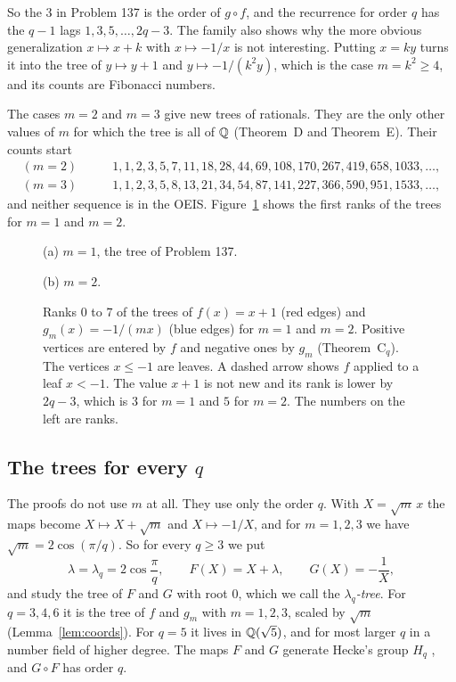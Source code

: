 So the $3$ in Problem 137 is the order of $g\circ f$, and the recurrence for order $q$ has the
$q-1$ lags $1,3,5,\dots,2q-3$. The family also shows why the more obvious generalization
$x\mapsto x+k$ with $x\mapsto-1/x$ is not interesting. Putting $x=ky$ turns it into the tree of
$y\mapsto y+1$ and $y\mapsto-1/(k^2y)$, which is the case $m=k^2\ge4$, and its counts are
Fibonacci numbers.

The cases $m=2$ and $m=3$ give new trees of rationals. They are the only other values of $m$ for
which the tree is all of $\mathbb{Q}$ (Theorem~D and Theorem~E). Their counts start
\begin{align*}
(m=2)&\qquad 1, 1, 2, 3, 5, 7, 11, 18, 28, 44, 69, 108, 170, 267, 419, 658, 1033, \dots,\\
(m=3)&\qquad 1, 1, 2, 3, 5, 8, 13, 21, 34, 54, 87, 141, 227, 366, 590, 951, 1533, \dots,
\end{align*}
and neither sequence is in the OEIS. Figure~\ref{fig:trees} shows the first ranks of the trees for
$m=1$ and $m=2$.

\begin{figure}[p]
\centering
\resizebox{0.86\textwidth}{!}{}

\medskip
{\small (a) $m=1$, the tree of Problem 137.}

\bigskip
\resizebox{\textwidth}{!}{}

\medskip
{\small (b) $m=2$.}
\caption{Ranks $0$ to $7$ of the trees of $f(x)=x+1$ (\textcolor{fred}{red} edges) and
$g_m(x)=-1/(mx)$ (\textcolor{gblue}{blue} edges) for $m=1$ and $m=2$. Positive vertices are entered
by $f$ and negative ones by $g_m$ (Theorem~C$_q$). The vertices $x\le-1$ are leaves. A dashed arrow
shows $f$ applied to a leaf $x<-1$. The value $x+1$ is not new and its rank is lower by $2q-3$, which
is $3$ for $m=1$ and $5$ for $m=2$. The numbers on the left are ranks.}
\label{fig:trees}
\end{figure}

\subsection{The trees for every \texorpdfstring{$q$}{q}}

The proofs do not use $m$ at all. They use only the order $q$. With $X=\sqrt m\,x$ the maps become
$X\mapsto X+\sqrt m$ and $X\mapsto-1/X$, and for $m=1,2,3$ we have $\sqrt m=2\cos(\pi/q)$. So for
every $q\ge3$ we put
\[
\lambda=\lambda_q=2\cos\frac{\pi}{q},\qquad F(X)=X+\lambda,\qquad G(X)=-\frac1X ,
\]
and study the tree of $F$ and $G$ with root $0$, which we call the \emph{$\lambda_q$-tree}. For
$q=3,4,6$ it is the tree of $f$ and $g_m$ with $m=1,2,3$, scaled by $\sqrt m$
(Lemma~\ref{lem:coords}). For $q=5$ it lives in $\mathbb{Q}(\sqrt5)$, and for most larger $q$ in a number
field of higher degree. The maps $F$ and $G$ generate Hecke's group $H_q$ \cite{hecke1936}, and
$G\circ F$ has order $q$.

